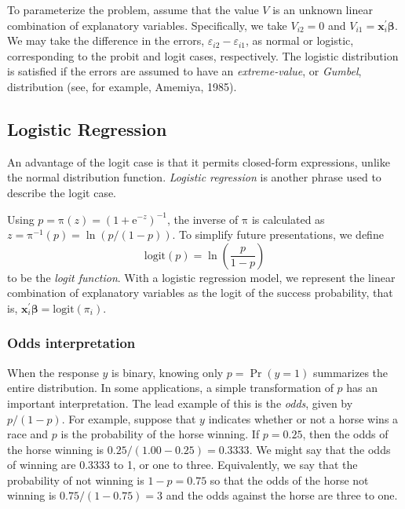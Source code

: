 To parameterize the problem, assume that the value $V$ is an unknown
linear combination of explanatory variables. Specifically, we take
$V_{i2}=0$ and $V_{i1}=\mathbf{x}_i^{\mathbf{\prime}}\boldsymbol
\beta$. We may take the difference in the errors,
$\varepsilon_{i2}-\varepsilon_{i1}$, as normal or logistic,
corresponding to the probit and logit cases, respectively. The
logistic distribution is satisfied if the errors are assumed to have
an \emph{extreme-value}, or \emph{Gumbel}, distribution (see, for
example, Amemiya, 1985).

\subsection{Logistic Regression}\label{S11:LogisticRegression}

An advantage of the logit case is that it permits closed-form expressions,
unlike the normal distribution function. \emph{Logistic regression} is
another phrase used to describe the logit case.

Using $p=\mathrm{\pi }(z)= \left( 1+ \mathrm{e}^{-z}\right)^{-1}$,
the inverse of $\mathrm{\pi }$ is calculated as $z=\mathrm{\pi
}^{-1}(p)=\ln(p/(1-p))$. To simplify future presentations, we define
\begin{equation*}
\mathrm{logit}(p)=\ln \left( \frac{p}{1-p}\right)
\end{equation*}
to be the \emph{logit function}. With a logistic regression model,
we represent the linear combination of explanatory variables as the
logit of the success probability, that is,
$\mathbf{x}_i^{\mathbf{\prime}}\boldsymbol \beta
=\mathrm{logit}(\pi_i)$.

\subsubsection*{Odds interpretation}

When the response $y$ is binary, knowing only $p=\Pr(y=1)$
summarizes the entire distribution. In some applications, a simple
transformation of $p$ has an important interpretation. The lead
example of this is the \emph{odds}, given by $p/(1-p)$. For example,
suppose that $y$ indicates whether or not a horse wins a race and
$p$ is the probability of
the horse winning. If $p=0.25$, then the odds of the horse winning is $%
0.25/(1.00-0.25)=0.3333$. We might say that the odds of winning are 0.3333
to 1, or one to three. Equivalently, we say that the probability of not
winning is $1-p=0.75$ so that the odds of the horse not winning is $%
0.75/(1-0.75)=3$ and the odds against the horse are three to one.

